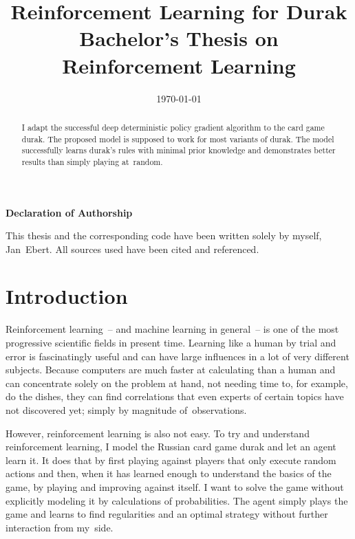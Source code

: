 \documentclass[a4paper,titlepage]{article}
\title{Reinforcement Learning for Durak \\ \medskip \large{Bachelor's Thesis on Reinforcement Learning}}
\date{\today}
\begin{document}
\maketitle

\setcounter{page}{2}
\thispagestyle{empty}
\noindent
\textbf{Declaration of Authorship} \medskip

\noindent
This thesis and the corresponding code have been written solely by myself, Jan~Ebert. All sources used have been cited and referenced. \bigskip

\noindent
\makebox[3cm]{\hrulefill} \hspace{0.2cm} \makebox[4cm]{\hrulefill}

\noindent
{} \hspace{0.2cm} 

\begin{abstract}
\setcounter{page}{3}
I adapt the successful deep deterministic policy gradient algorithm to the card game durak. The proposed model is supposed to work for most variants of durak. The model successfully learns durak's rules with minimal prior knowledge %
and demonstrates better results than simply playing at~random.
\end{abstract}

\setcounter{page}{4}
\thispagestyle{empty}
\tableofcontents

\newpage


\section{Introduction}

Reinforcement learning~-- and machine learning in general~-- is one of the most progressive scientific fields in present time. Learning like a human by trial and error is fascinatingly useful and can have large influences in a lot of very different subjects. Because computers are much faster at calculating than a human and can concentrate solely on the problem at hand, not needing time to, for example, do the dishes, they can find correlations that even experts of certain topics have not discovered yet; simply by magnitude of~observations.

However, reinforcement learning is also not easy. To try and understand reinforcement learning, I model the Russian card game durak and let an agent learn it. It does that by first playing against players that only execute random actions and then, when it has learned enough to understand the basics of the game, by playing and improving against itself. I want to solve the game without explicitly modeling it by calculations of probabilities. The agent simply plays the game and learns to find regularities and an optimal strategy without further interaction from my~side.
\end{document}
